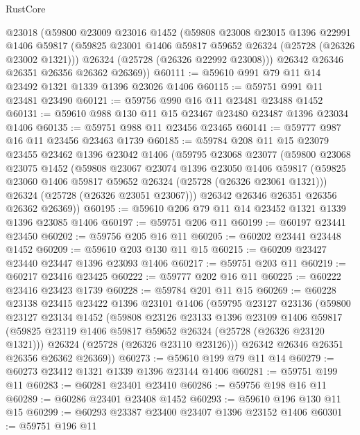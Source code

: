 \begin{lexlean}{RustCore}
\begin{coremodule}
      @23018
      (@59800
        @23009
        @23016
        @1452
        (@59808
          @23008
          @23015
          @1396
          @22991
          @1406
          @59817
          (@59825 @23001 @1406 @59817 @59652 @26324 (@25728 (@26326 @23002 @1321)))
          @26324
          (@25728 (@26326 @22992 @23008)))
        @26342
        @26346
        @26351
        @26356
        @26362
        @26369))
@60111 := @59610 @991 @79 @11 @14 @23492 @1321 @1339 @1396 @23026 @1406
@60115 := @59751 @991 @11 @23481 @23490
@60121 := @59756 @990 @16 @11 @23481 @23488 @1452
@60131 := @59610 @988 @130 @11 @15 @23467 @23480 @23487 @1396 @23034 @1406
@60135 := @59751 @988 @11 @23456 @23465
@60141 := @59777 @987 @16 @11 @23456 @23463 @1739
@60185 := @59784
    @208
    @11
    @15
    @23079
    @23455
    @23462
    @1396
    @23042
    @1406
    (@59795
      @23068
      @23077
      (@59800
        @23068
        @23075
        @1452
        (@59808
          @23067
          @23074
          @1396
          @23050
          @1406
          @59817
          (@59825 @23060 @1406 @59817 @59652 @26324 (@25728 (@26326 @23061 @1321)))
          @26324
          (@25728 (@26326 @23051 @23067)))
        @26342
        @26346
        @26351
        @26356
        @26362
        @26369))
@60195 := @59610 @206 @79 @11 @14 @23452 @1321 @1339 @1396 @23085 @1406
@60197 := @59751 @206 @11
@60199 := @60197 @23441 @23450
@60202 := @59756 @205 @16 @11
@60205 := @60202 @23441 @23448 @1452
@60209 := @59610 @203 @130 @11 @15
@60215 := @60209 @23427 @23440 @23447 @1396 @23093 @1406
@60217 := @59751 @203 @11
@60219 := @60217 @23416 @23425
@60222 := @59777 @202 @16 @11
@60225 := @60222 @23416 @23423 @1739
@60228 := @59784 @201 @11 @15
@60269 := @60228
    @23138
    @23415
    @23422
    @1396
    @23101
    @1406
    (@59795
      @23127
      @23136
      (@59800
        @23127
        @23134
        @1452
        (@59808
          @23126
          @23133
          @1396
          @23109
          @1406
          @59817
          (@59825 @23119 @1406 @59817 @59652 @26324 (@25728 (@26326 @23120 @1321)))
          @26324
          (@25728 (@26326 @23110 @23126)))
        @26342
        @26346
        @26351
        @26356
        @26362
        @26369))
@60273 := @59610 @199 @79 @11 @14
@60279 := @60273 @23412 @1321 @1339 @1396 @23144 @1406
@60281 := @59751 @199 @11
@60283 := @60281 @23401 @23410
@60286 := @59756 @198 @16 @11
@60289 := @60286 @23401 @23408 @1452
@60293 := @59610 @196 @130 @11 @15
@60299 := @60293 @23387 @23400 @23407 @1396 @23152 @1406
@60301 := @59751 @196 @11

\end{coremodule}
\end{lexlean}
